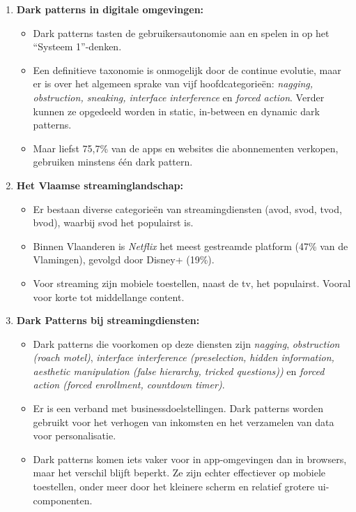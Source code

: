 \begin{enumerate}
    \item \textbf{Dark patterns in digitale omgevingen:}
    \begin{itemize}
        \item Dark patterns tasten de gebruikersautonomie aan en spelen in op het ``Systeem 1''-denken.
        \item Een definitieve taxonomie is onmogelijk door de continue evolutie, maar er is over het algemeen sprake van vijf hoofdcategorieën: \textit{nagging, obstruction, sneaking, interface interference} en \textit{forced action}. Verder kunnen ze opgedeeld worden in static, in-between en dynamic dark patterns.
        \item Maar liefst 75,7\% van de apps en websites die abonnementen verkopen, gebruiken minstens één dark pattern.
    \end{itemize}
    
    \vspace{1em}
    
    \item \textbf{Het Vlaamse streaminglandschap:}
    \begin{itemize}
        \item Er bestaan diverse categorieën van streamingdiensten (\acrshort{avod}, \acrshort{svod}, \acrshort{tvod}, \acrshort{bvod}), waarbij \acrlong{svod} het populairst is.
        \item Binnen Vlaanderen is \textit{Netflix} het meest gestreamde platform (47\% van de Vlamingen), gevolgd door Disney+ (19\%).
        \item Voor streaming zijn mobiele toestellen, naast de tv, het populairst. Vooral voor korte tot middellange content.
    \end{itemize}
    
    \vspace{1em}
    
    \item \textbf{Dark Patterns bij streamingdiensten:}
    \begin{itemize}
        \item Dark patterns die voorkomen op deze diensten zijn \textit{nagging}, \textit{obstruction (roach motel)}, \textit{interface interference (preselection, hidden information, aesthetic manipulation (false hierarchy, tricked questions))} en \textit{forced action (forced enrollment, countdown timer)}.        
        \item Er is een verband met businessdoelstellingen. Dark patterns worden gebruikt voor het verhogen van inkomsten en het verzamelen van data voor personalisatie.
        \item Dark patterns komen iets vaker voor in app-omgevingen dan in browsers, maar het verschil blijft beperkt. Ze zijn echter effectiever op mobiele toestellen, onder meer door het kleinere scherm en relatief grotere \acrshort{ui}-componenten.
    \end{itemize}
    

\end{enumerate}
